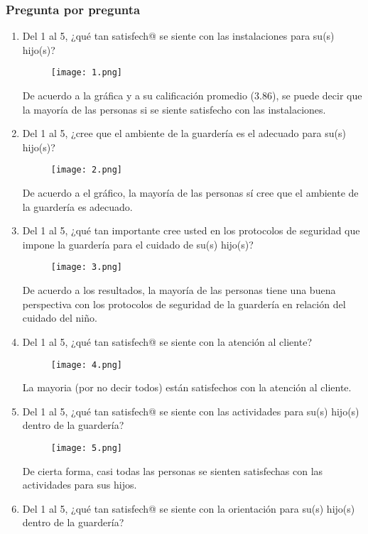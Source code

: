 \documentclass[letterpaper,12pt]{article}
\begin{document}
\begin{sloppypar}
\subsubsection{Pregunta por pregunta}
\begin{enumerate}
  \item Del 1 al 5, ¿qué tan satisfech@ se siente con las instalaciones para su(s) hijo(s)?
  \begin{figure}[H]
    \centering 
    \texttt{[image: 1.png]}
  \end{figure}
  De acuerdo a la gráfica y a su calificación promedio (3.86), se puede decir que la mayoría de las personas si se siente satisfecho con las instalaciones.
  \item Del 1 al 5, ¿cree que el ambiente de la guardería es el adecuado para su(s) hijo(s)? 
  \begin{figure}[H]
    \centering 
    \texttt{[image: 2.png]}
  \end{figure}
  De acuerdo a el gráfico, la mayoría de las personas sí cree que el ambiente de la guardería es adecuado.
  \newpage
  \item Del 1 al 5, ¿qué tan importante cree usted en los protocolos de seguridad que impone la guardería para el cuidado de su(s) hijo(s)? 
  \begin{figure}[H]
    \centering 
    \texttt{[image: 3.png]}
  \end{figure}
  De acuerdo a los resultados, la mayoría de las personas tiene una buena perspectiva con los protocolos de seguridad de la guardería en relación del cuidado del niño.
  \item Del 1 al 5, ¿qué tan satisfech@ se siente con la atención al cliente? 
  \begin{figure}[H]
    \centering 
    \texttt{[image: 4.png]}
  \end{figure}
  La mayoria (por no decir todos) están satisfechos con la atención al cliente.
  \newpage
  \item Del 1 al 5, ¿qué tan satisfech@ se siente con las actividades para su(s) hijo(s) dentro de la guardería? 
  \begin{figure}[H]
    \centering 
    \texttt{[image: 5.png]}
  \end{figure}
  De cierta forma, casi todas las personas se sienten satisfechas con las actividades para sus hijos.
  \item Del 1 al 5, ¿qué tan satisfech@ se siente con la orientación para su(s) hijo(s) dentro de la guardería? 

\end{enumerate}
\end{sloppypar}
\end{document}

